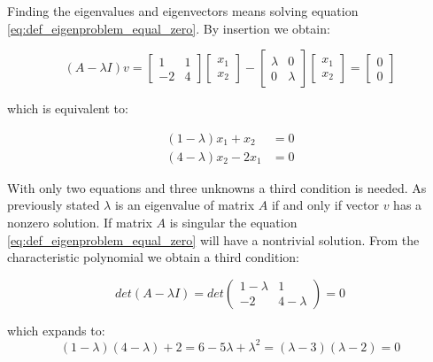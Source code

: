 Finding the eigenvalues and eigenvectors means solving equation
\eqref{eq:def_eigenproblem_equal_zero}. By insertion we obtain:

\begin{equation*}
( A - \lambda I) v =
\begin{bmatrix} 
  1 & 1 \\ 
  -2 & 4 
\end{bmatrix} 
\begin{bmatrix} 
x_1 \\ x_2 
\end{bmatrix} 
-
\begin{bmatrix} 
\lambda & 0 \\
0 & \lambda  
\end{bmatrix} 
\begin{bmatrix} 
x_1 \\ x_2 
\end{bmatrix}
= 
\begin{bmatrix} 
0 \\ 0 
\end{bmatrix}  
\end{equation*}

which is equivalent to:

\begin{align}
\label{eq:eigenvalue_one}
(1 - \lambda) x_1 + x_2 & = 0 \\
\label{eq:eigenvalue_two}
(4 - \lambda) x_2 - 2x_1 & = 0
\end{align}

With only two equations and three unknowns a third condition is
needed. As previously stated $\lambda$ is an eigenvalue of matrix 
$A$ if and only if vector $v$ has a nonzero solution. If matrix $A$ is
singular the equation \eqref{eq:def_eigenproblem_equal_zero} will have a
nontrivial solution. From the characteristic polynomial we obtain a
third condition:

\begin{equation} 
det(A - \lambda I) = det
\begin{pmatrix} 
  1 - \lambda & 1 \\ 
  -2 & 4 - \lambda 
\end{pmatrix}
= 0
\end{equation}

which expands to:
\begin{equation}
(1 - \lambda)(4 - \lambda) + 2 = 6 - 5 \lambda + \lambda^2 = (\lambda
- 3)(\lambda - 2) = 0
\end{equation}

